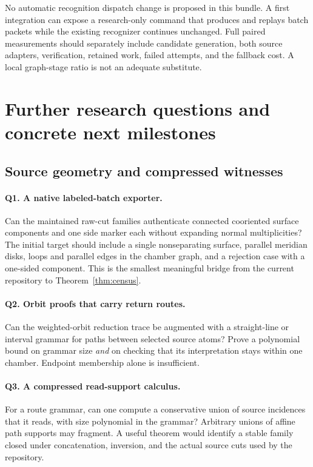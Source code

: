 \documentclass[11pt]{article}
\theoremstyle{definition}
\begin{document}
No automatic recognition dispatch change is proposed in this bundle. A first integration can expose a research-only command that produces and replays batch packets while the existing recognizer continues unchanged. Full paired measurements should separately include candidate generation, both source adapters, verification, retained work, failed attempts, and the fallback cost. A local graph-stage ratio is not an adequate substitute.

\section{Further research questions and concrete next milestones}\label{sec:future}
\subsection{Source geometry and compressed witnesses}
\paragraph{Q1. A native labeled-batch exporter.}
Can the maintained raw-cut families authenticate connected cooriented surface components and one side marker each without expanding normal multiplicities? The initial target should include a single nonseparating surface, parallel meridian disks, loops and parallel edges in the chamber graph, and a rejection case with a one-sided component. This is the smallest meaningful bridge from the current repository to Theorem~\ref{thm:census}.

\paragraph{Q2. Orbit proofs that carry return routes.}
Can the weighted-orbit reduction trace be augmented with a straight-line or interval grammar for paths between selected source atoms? Prove a polynomial bound on grammar size \emph{and} on checking that its interpretation stays within one chamber. Endpoint membership alone is insufficient.

\paragraph{Q3. A compressed read-support calculus.}
For a route grammar, can one compute a conservative union of source incidences that it reads, with size polynomial in the grammar? Arbitrary unions of affine path supports may fragment. A useful theorem would identify a stable family closed under concatenation, inversion, and the actual source cuts used by the repository.
\end{document}

